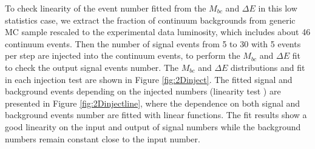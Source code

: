 To check linearity of the event number fitted from the $M_{bc}$ and $\Delta E$ in this low statistics case, we extract the fraction of continuum backgrounds from generic MC sample rescaled to the experimental data luminosity, which includes about 46 continuum events. Then the number of signal events from 5 to 30 with 5 events per step are injected into the continuum events, to perform the $M_{bc}$ and $\Delta E$ fit to check the output signal events number. The $M_{bc}$ and $\Delta E$ distributions and fit in each injection test are shown in Figure \ref{fig:2Dinject}. The fitted signal and background events depending on the injected numbers (linearity test ) are presented in Figure \ref{fig:2Dinjectline}, where the dependence on both signal and background events number are fitted with linear functions. The fit results show a good linearity on the input and output of signal numbers while the background numbers remain constant close to the input number.

